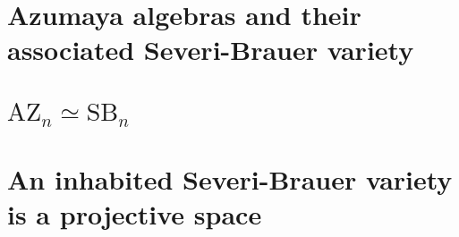 \documentclass{../util/zariski}
\newcommand{\SB}{\mathrm{SB}}
\newcommand{\AZ}{\mathrm{AZ}}
\begin{document}
\section{Azumaya algebras and their associated Severi-Brauer variety}


\section{$\AZ_n\simeq \SB_n$}


\section{An inhabited Severi-Brauer variety is a projective space}


\printindex

\printbibliography
\end{document}
